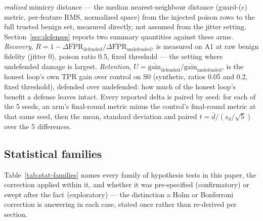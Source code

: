 \emph{realized} mimicry distance — the median nearest-neighbour distance (guard-(c) metric,
per-feature RMS, normalized space) from the injected poison rows to the full trusted benign
set, measured directly, not assumed from the jitter setting.
Section~\ref{sec:defenses} reports two summary quantities against these arms. \emph{Recovery},
$R = 1 - \overline{\Delta\text{FPR}}_{\text{defended}} / \overline{\Delta\text{FPR}}_{\text{undefended}}$,
is measured on A1 at raw benign fidelity (jitter 0), poison ratio 0.5, fixed threshold — the
setting where undefended damage is largest. \emph{Retention},
$U = \overline{\text{gain}}_{\text{defended}} / \overline{\text{gain}}_{\text{undefended}}$, is
the honest loop's own  TPR gain over control on S0 (synthetic, ratios
0.05 and 0.2, fixed threshold), defended over undefended: how much of the honest loop's benefit
a defense leaves intact.
Every reported delta is paired by seed: for each of the 5 seeds, an arm's final-round metric
minus the control's final-round metric at that same seed, then the mean, standard deviation and
paired $t = \bar{d} / (s_d/\sqrt{5})$ over the 5 differences.

\subsection{Statistical families}
\label{sec:stat-families}
Table~\ref{tab:stat-families} names every family of hypothesis tests in this paper, the
correction applied within it, and whether it was pre-specified (confirmatory) or swept
after the fact (exploratory) — the distinction a Holm or Bonferroni correction is answering in
each case, stated once rather than re-derived per section.

